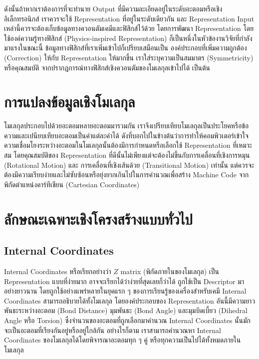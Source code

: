 ดังนั้นถ้าหากเราต้องการที่จะทำนาย Output ที่มีความละเอียดอยู่ในระดับอะตอมหรือเชิงอิเล็กทรอนิกส์ เราควรจะใช้ Representation ที่อยู่ในระดับเดียวกัน 
และ Representation Input เหล่านี้ควรจะต้องเก็บข้อมูลทางควอนตัมเคมีและฟิสิกส์ไว้ด้วย โดยการพัฒนา Representation โดยใช้องค์ความรู้ทางฟิสิกส์
(Physics-inspired Representation) ก็เป็นหนึ่งในหัวข้องานวิจัยที่กำลังมาแรงในขณะนี้ ข้อมูลทางฟิสิกส์ที่เราเพิ่มเข้าไปก็เปรียบเสมือนเป็น%
องค์ประกอบที่เพิ่มความถูกต้อง (Correction) ให้กับ Representation ให้มากขึ้น เราใส่ระบุความเป็นสมมาตร (Symmetricity) หรือคุณสมบัติ%
จากปรากฎการณ์ทางฟิสิกส์เชิงควอนตัมของโมเลกุลเข้าไปได้ เป็นต้น 

\section{การแปลงข้อมูลเชิงโมเลกุล}

โมเลกุลประกอบไปด้วยอะตอมหลายอะตอมมารวมกัน เราจึงเปรียบเทียบโมเลกุลเป็นประโยคหรือข้อความและเปนียบเทียบอะตอมเป็นคำแต่ละคำได้
ดังที่บอกไปในข้างต้นว่าการทำให้คอมพิวเตอร์เข้าใจความเชื่อมโยงระหว่างอะตอมในโมเลกุลนั้นต้องมีการกำหนดหรือเลือกใช้ Representation ที่เหมาะสม
โดยคุณสมบัติของ Representation ที่ดีนั้นไม่เพียงแต่จะต้องไม่ขึ้นกับการเคลื่อนที่เชิงการหมุน (Rotational Motion) และ การเคลื่อนที่เชิงเส้นด้วย 
(Transitional Motion) เท่านั้น แต่ควรจะต้องมีความเรียบง่ายและไม่ซับซ้อนหรือยุ่งยากเกินไปในการคำนวณเพื่อสร้าง Machine Code 
จากพิกัดตำแหน่งคาร์ทีเชียน (Cartesian Coordinates)

\section{ลักษณะเฉพาะเชิงโครงสร้างแบบทั่วไป}

\subsection{Internal Coordinates}

Internal Coordinates หรือเรียกอย่างว่า $Z$ matrix (พิกัดภายในของโมเลกุล) เป็น Representation แบบที่ง่ายมาก 
อาจจะเรียกได้ว่าง่ายที่สุดเลยก็ว่าได้ ถูกใช้เป็น Descriptor มาอย่างยาวนาน โดยถูกใช้อย่างแพร่หลายในยุคแรก ๆ ของการเรียนรู้ของเครื่องสำหรับเคมี
Internal Coordinates สามารถอธิบายได้ทั้งโมเลกุล โดยองค์ประกอบของ Representation อันนี้มีความยาวพันธะระหว่างอะตอม (Bond Distance) 
มุมพันธะ (Bond Angle) และมุมบิดเบี้ยว (Dihedral Angle หรือ Torsion) ซึ่งจำนวนของอะตอมที่ถูกเลือกมาคำนวณ Internal Coordinates 
นั้นมักจะเป็นอะตอมที่เรียงกันอยู่หรืออยู่ใกล้กัน อย่างไรก็ตาม เราสามารถคำนวณหา Internal Coordinates ของโมเลกุลได้โดยพิจารณาอะตอมทุก ๆ คู่
หรือทุกความเป็นไปได้ทั้งหมดภายในโมเลกุล

